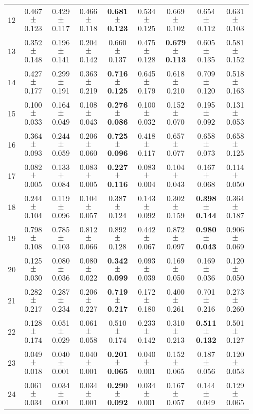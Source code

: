 \begin{table}[!ht]
{\begin{tabular}{r c c c c c c c c}
12 & 0.467 $\pm$ 0.123 & 0.429 $\pm$ 0.117 & 0.466 $\pm$ 0.118 & \textbf{0.681 $\pm$ 0.123} & 0.534 $\pm$ 0.125 & 0.669 $\pm$ 0.102 & 0.654 $\pm$ 0.112 & 0.631 $\pm$ 0.103 \\
13 & 0.352 $\pm$ 0.148 & 0.196 $\pm$ 0.141 & 0.204 $\pm$ 0.142 & 0.660 $\pm$ 0.137 & 0.475 $\pm$ 0.128 & \textbf{0.679 $\pm$ 0.113} & 0.605 $\pm$ 0.135 & 0.581 $\pm$ 0.152 \\
14 & 0.427 $\pm$ 0.177 & 0.299 $\pm$ 0.191 & 0.363 $\pm$ 0.219 & \textbf{0.716 $\pm$ 0.125} & 0.645 $\pm$ 0.179 & 0.618 $\pm$ 0.210 & 0.709 $\pm$ 0.120 & 0.518 $\pm$ 0.163 \\
15 & 0.100 $\pm$ 0.033 & 0.164 $\pm$ 0.049 & 0.108 $\pm$ 0.043 & \textbf{0.276 $\pm$ 0.086} & 0.100 $\pm$ 0.032 & 0.152 $\pm$ 0.070 & 0.195 $\pm$ 0.092 & 0.131 $\pm$ 0.053 \\
16 & 0.364 $\pm$ 0.093 & 0.244 $\pm$ 0.059 & 0.206 $\pm$ 0.060 & \textbf{0.725 $\pm$ 0.096} & 0.418 $\pm$ 0.117 & 0.657 $\pm$ 0.077 & 0.658 $\pm$ 0.073 & 0.658 $\pm$ 0.125 \\
17 & 0.082 $\pm$ 0.005 & 0.133 $\pm$ 0.084 & 0.083 $\pm$ 0.005 & \textbf{0.227 $\pm$ 0.116} & 0.083 $\pm$ 0.004 & 0.104 $\pm$ 0.043 & 0.167 $\pm$ 0.068 & 0.114 $\pm$ 0.050 \\
18 & 0.244 $\pm$ 0.104 & 0.119 $\pm$ 0.096 & 0.104 $\pm$ 0.057 & 0.387 $\pm$ 0.124 & 0.143 $\pm$ 0.092 & 0.302 $\pm$ 0.159 & \textbf{0.398 $\pm$ 0.144} & 0.364 $\pm$ 0.187 \\
19 & 0.798 $\pm$ 0.108 & 0.785 $\pm$ 0.103 & 0.812 $\pm$ 0.066 & 0.892 $\pm$ 0.128 & 0.442 $\pm$ 0.067 & 0.872 $\pm$ 0.097 & \textbf{0.980 $\pm$ 0.043} & 0.906 $\pm$ 0.069 \\
20 & 0.125 $\pm$ 0.030 & 0.080 $\pm$ 0.036 & 0.080 $\pm$ 0.022 & \textbf{0.342 $\pm$ 0.099} & 0.093 $\pm$ 0.039 & 0.169 $\pm$ 0.050 & 0.169 $\pm$ 0.036 & 0.120 $\pm$ 0.050 \\
21 & 0.282 $\pm$ 0.217 & 0.287 $\pm$ 0.234 & 0.206 $\pm$ 0.227 & \textbf{0.719 $\pm$ 0.217} & 0.172 $\pm$ 0.180 & 0.400 $\pm$ 0.261 & 0.701 $\pm$ 0.216 & 0.273 $\pm$ 0.260 \\
22 & 0.128 $\pm$ 0.174 & 0.051 $\pm$ 0.029 & 0.061 $\pm$ 0.058 & 0.510 $\pm$ 0.174 & 0.233 $\pm$ 0.142 & 0.310 $\pm$ 0.213 & \textbf{0.511 $\pm$ 0.132} & 0.501 $\pm$ 0.127 \\
23 & 0.049 $\pm$ 0.018 & 0.040 $\pm$ 0.001 & 0.040 $\pm$ 0.001 & \textbf{0.201 $\pm$ 0.065} & 0.040 $\pm$ 0.001 & 0.152 $\pm$ 0.065 & 0.187 $\pm$ 0.056 & 0.120 $\pm$ 0.053 \\
24 & 0.061 $\pm$ 0.034 & 0.034 $\pm$ 0.001 & 0.034 $\pm$ 0.001 & \textbf{0.290 $\pm$ 0.092} & 0.034 $\pm$ 0.001 & 0.167 $\pm$ 0.057 & 0.144 $\pm$ 0.049 & 0.129 $\pm$ 0.065 \\

\end{tabular}}
\end{table}

